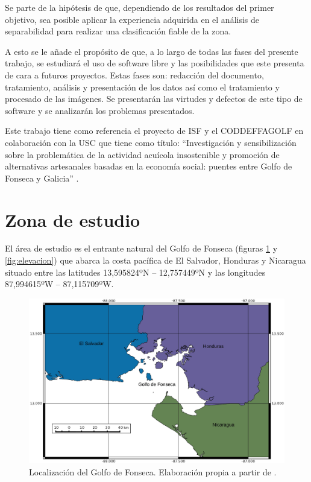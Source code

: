 Se parte de la hipótesis de que, dependiendo de los resultados del primer objetivo, sea posible aplicar la experiencia adquirida en el análisis de separabilidad para realizar una clasificación fiable de la zona.\Sep

A esto se le añade el propósito de que, a lo largo de todas las fases del presente trabajo, se estudiará el uso de software libre y las posibilidades que este presenta de cara a futuros proyectos. Estas fases son: redacción del documento, tratamiento, análisis y presentación de los datos así como el tratamiento y procesado de las imágenes. Se presentarán las virtudes y defectos de este tipo de software y se analizarán los problemas presentados.\Sep

Este trabajo tiene como referencia el proyecto de \ac{ISF} y el \ac{CODDEFFAGOLF} en colaboración con la \ac{USC} que tiene como título: ``Investigación y sensibilización sobre la problemática de la actividad acuícola insostenible y promoción de alternativas artesanales basadas en la economía social: puentes entre Golfo de Fonseca y Galicia'' \citep{laborate2014}.

\section{Zona de estudio}\label{sec:zonaestudio}
El área de estudio es el entrante natural del Golfo de Fonseca (figuras \ref{fig:localizacion} y \ref{fig:elevacion}) que abarca la costa pacífica de El Salvador, Honduras y Nicaragua situado entre las latitudes 13,595824ºN – 12,757449ºN y las longitudes 87,994615ºW – 87,115709ºW.\Sep

\begin{figure}
	\centering
	\includegraphics[width=0.8\linewidth]{./Imagenes/localizacion.eps}
	\caption[Localización del Golfo de Fonseca]{Localización del Golfo de Fonseca. Elaboración propia a partir de \cite{GADM2012}.}
	\label{fig:localizacion}
\end{figure}

